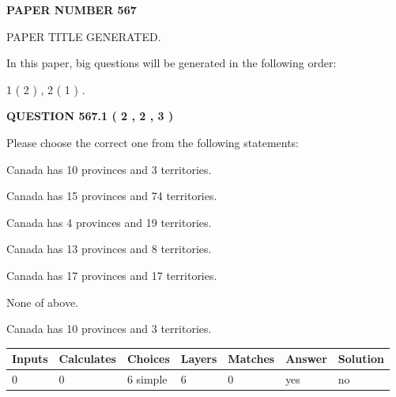 \documentclass[12pt]{article}
\begin{document}
   
 {\textbf{ \Large{ PAPER NUMBER  567  }}}
   
   
\vspace{0.2in}
   
   
   
   
   
   
   
   
 \vspace{0.2in}
 
 
 
 
   
   
 PAPER TITLE GENERATED.
   
   
   
\vspace{0.2in}
   
In this paper, big questions will be generated in the following order: 
   
   
   1 ( 2 )
 ,
   2 ( 1 )
 .
  
\vspace{0.2in}
  
{\textbf{\Large{QUESTION
567.1 
 ( 2 , 2 , 3 )
}}}
  
  
Please choose the correct one from the following statements:
 
 
Canada has 10  provinces and 3 territories.
 
 
Canada has  15 provinces and  74 territories.
 
 
Canada has   4 provinces and  19 territories.
 
 
Canada has  13 provinces and  8 territories.
 
 
Canada has  17 provinces and  17 territories.
 
 
 None of above.
 
 
\noindent{}
 
 
Canada has 10  provinces and 3 territories.
 
 
\noindent{}
 
 
   
   
   
   
\noindent\begin{tabular}{|l|l|l|l|l|l|l|}
 \hline
Inputs & Calculates & Choices & Layers & Matches & Answer & Solution \\ \hline
 0  & 
 0  & 
 6
  simple  
  & 
 6  & 
 0  & 
  yes & 
  no 
  \\ \hline
 \end{tabular}
   
\end{document}
